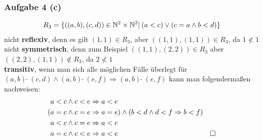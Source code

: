 \documentclass[a4paper, 10pt]{scrartcl}
\begin{document}
\subsubsection*{Aufgabe 4 \small(c)}
\begin{align}
    R_3 = \{((a, b), (c, d)) \in \mathbb{N}^2 \times \mathbb{N}^2 |\: (a < c) \vee (c = a \wedge b < d) \} \notag 
\end{align}
nicht \textbf{reflexiv}, denn es gilt $(1, 1) \in R_3$, aber $((1, 1), (1, 1)) \in R_3$, da $1 \nless 1$ \\
nicht \textbf{symmetrisch}, denn zum Beispiel $((1, 1), (2, 2)) \in R_3$ aber $((2, 2), (1, 1)) \notin R_3$, da $2 \nless 1$  \\
\textbf{transitiv}, wenn man sich alle möglichen Fälle überlegt für $(a, b) \:\tilde{} \: (c, d) \wedge (a, b) \: \tilde{} \: (e, f) \Rightarrow (a, b) \: \tilde{} \: (e, f)$ kann man folgendermaßen nachweisen: \\
\begin{align}
    a < c \wedge c < e &\Rightarrow a < e \notag \\
    (a = c \wedge c = e &\Rightarrow a = e) \wedge (b < d \wedge d < f \Rightarrow b < f) \notag \\
    a < c \wedge c = e &\Rightarrow a < e \notag \\
    a = c \wedge c < e &\Rightarrow a < e \notag & \Box 
\end{align}
\end{document}

